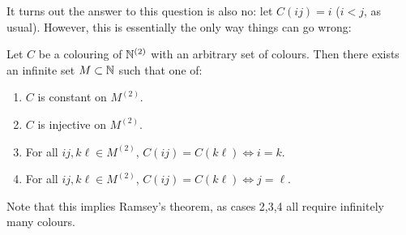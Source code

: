 \documentclass[10pt,a4paper]{article}
\begin{document}
It turns out the answer to this question is also no: let $C(ij) = i$ ($i < j$, as usual). However, this is essentially the only way things can go wrong:
\begin{theorem}
  Let $C$ be a colouring of $\mathbb{N}^{(2)}$ with an arbitrary set of colours. Then there exists an infinite set $M \subset \mathbb{N}$ such that one of:
  \begin{enumerate}
    \item $C$ is constant on $M^{(2)}$.
    \item $C$ is injective on $M^{(2)}$.
    \item For all $ij, k\ell \in M^{(2)}$, $C(ij) = C(k\ell) \iff i=k$.
    \item For all $ij, k\ell \in M^{(2)}$, $C(ij) = C(k\ell) \iff j=\ell$.
  \end{enumerate}
\end{theorem}
Note that this implies Ramsey's theorem, as cases 2,3,4 all require infinitely many colours.
\end{document}
